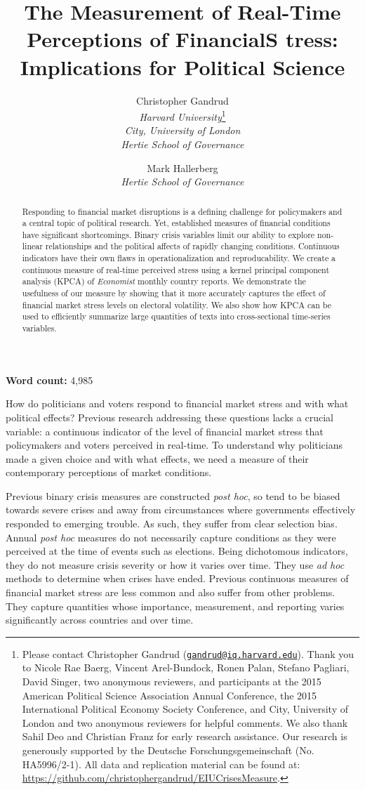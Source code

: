 \documentclass[]{article}
\title{The Measurement of Real-Time Perceptions of FinancialS tress: Implications for Political Science}
\author{Christopher Gandrud \\ \emph{Harvard University}\footnote{Please contact Christopher Gandrud
(\href{mailto:gandrud@hertie-school.org}{\nolinkurl{gandrud@iq.harvard.edu}}).
Thank you to Nicole Rae Baerg, Vincent Arel-Bundock, Ronen Palan, Stefano Pagliari, David Singer, two anonymous reviewers, and participants at the 2015 American Political Science Association Annual Conference, the 2015 International Political Economy Society Conference, and City, University of London and two anonymous reviewers for helpful comments. We also thank Sahil Deo and Christian Franz for early research assistance. Our research is generously supported by the Deutsche Forschungsgemeinschaft (No. HA5996/2-1). All data and replication material can be found at: \url{https://github.com/christophergandrud/EIUCrisesMeasure}.} \\ \emph{City, University of London} \\ \emph{Hertie School of Governance}
\and
Mark Hallerberg \\ \emph{Hertie School of Governance}}
\begin{document}
\maketitle

\begin{abstract}

Responding to financial market disruptions is a defining challenge for policymakers and a central topic of political research. Yet, established measures of financial conditions have significant shortcomings. Binary crisis variables limit our ability to explore non-linear relationships and the political affects of rapidly changing conditions. Continuous indicators have their own flaws in operationalization and reproducability. We create a continuous measure of real-time perceived stress using a kernel principal component analysis (KPCA) of \emph{Economist} monthly country reports. We demonstrate the usefulness of our measure by showing that it more accurately captures the effect of financial market stress levels on electoral volatility. We also show how KPCA can be used to efficiently summarize large quantities of texts into cross-sectional time-series variables.

\end{abstract}


\textbf{Word count:} 4,985

\clearpage

How do politicians and voters respond to financial market stress and with what political effects? Previous research addressing these questions lacks a crucial variable: a continuous indicator of the level of financial market stress that policymakers and voters perceived in real-time. To understand why politicians made a given choice and with what effects, we need a measure of their contemporary perceptions of market conditions.

Previous binary crisis measures are constructed \textit{post hoc}, so tend to be biased towards severe crises and away from circumstances where governments effectively responded to emerging trouble. As such, they suffer from clear selection bias. Annual \textit{post hoc} measures do not necessarily capture conditions as they were perceived at the time of events such as elections. Being dichotomous indicators, they do not measure crisis severity or how it varies over time. They use \textit{ad hoc} methods to determine when crises have ended. Previous continuous measures of financial market stress are less common and also suffer from other problems. They capture quantities whose importance, measurement, and reporting varies significantly across countries and over time.
\end{document}
